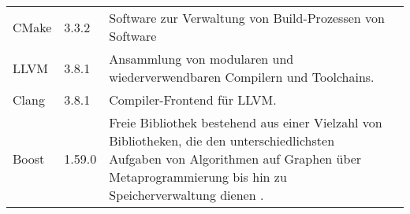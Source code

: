 \begin{tabular}{llp{10cm}l}
    CMake      & 3.3.2   & Software zur Verwaltung von Build-Prozessen von 
                           Software
                           &\protect\footnotemark\\

    LLVM       & 3.8.1   & Ansammlung von modularen und wiederverwendbaren
                           Compilern und Toolchains.
                           &\protect\footnotemark\\

    Clang      & 3.8.1   & Compiler-Frontend für LLVM.\@
                           &\protect\footnotemark\\

    Boost      & 1.59.0  & Freie Bibliothek bestehend aus einer Vielzahl von
                           Bibliotheken, die den unterschiedlichsten
                           Aufgaben von Algorithmen auf Graphen über 
                           Metaprogrammierung bis hin zu Speicherverwaltung
                           dienen
                           \parencite{wikipedia_the_free_encyclopedia_boost_2015}.
                           &\protect\footnotemark\\
    \bottomrule
\end{tabular}


